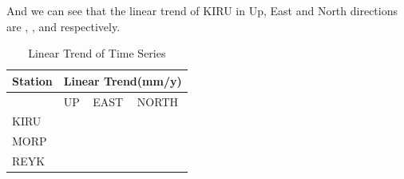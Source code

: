 \documentclass{article}
\begin{document}
And we can see that the linear trend of KIRU in Up, East and North directions are , , and respectively.
\begin{table}[htbp]
  \centering
  \caption{Linear Trend of Time Series}
    \begin{tabular}{lrrr}
    \large Station & \multicolumn{3}{c}{\large Linear Trend(mm/y)} \\
    \midrule
          & \multicolumn{1}{l}{\large UP} & \multicolumn{1}{l}{\large EAST} & \multicolumn{1}{l}{\large NORTH} \\
          
     KIRU  &       &       &  \\[3pt]
     MORP  &       &       &  \\[3pt]
     REYK  &       &       &  \\
    \end{tabular}%
  \label{Tab:lin_trend}%
\end{table}
\end{document}
